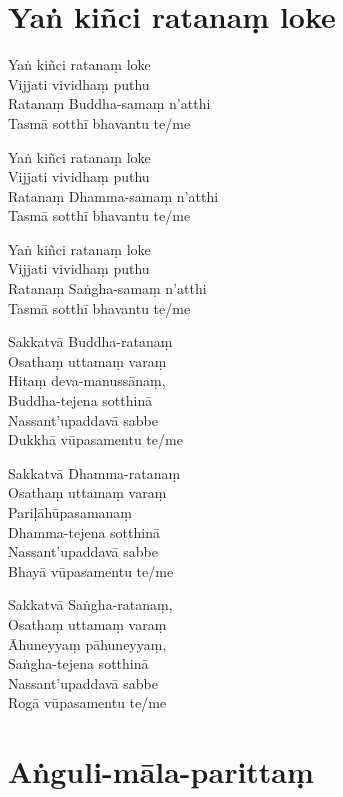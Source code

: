 \chapter{Yaṅ kiñci ratanaṃ loke}%


\begin{paritta}
Yaṅ kiñci ratanaṃ loke\\
Vijjati vividhaṃ puthu\\
Ratanaṃ Buddha-samaṃ n'atthi\\
Tasmā sotthī bhavantu te/me

Yaṅ kiñci ratanaṃ loke\\
Vijjati vividhaṃ puthu\\
Ratanaṃ Dhamma-samaṃ n'atthi\\
Tasmā sotthī bhavantu te/me

Yaṅ kiñci ratanaṃ loke\\
Vijjati vividhaṃ puthu\\
Ratanaṃ Saṅgha-samaṃ n'atthi\\
Tasmā sotthī bhavantu te/me

Sakkatvā Buddha-ratanaṃ\\
Osathaṃ uttamaṃ varaṃ\\
Hitaṃ deva-manussānaṃ,\\
Buddha-tejena sotthinā\\
Nassant'upaddavā sabbe\\
Dukkhā vūpasamentu te/me

Sakkatvā Dhamma-ratanaṃ\\
Osathaṃ uttamaṃ varaṃ\\
Pariḷāhūpasamanaṃ\\
Dhamma-tejena sotthinā\\
Nassant'upaddavā sabbe\\
Bhayā vūpasamentu te/me

Sakkatvā Saṅgha-ratanaṃ,\\
Osathaṃ uttamaṃ varaṃ\\
Āhuneyyaṃ pāhuneyyaṃ,\\
Saṅgha-tejena sotthinā\\
Nassant'upaddavā sabbe\\
Rogā vūpasamentu te/me
\end{paritta}

\enlargethispage{\baselineskip}

\chapter{Aṅguli-māla-parittaṃ}%

